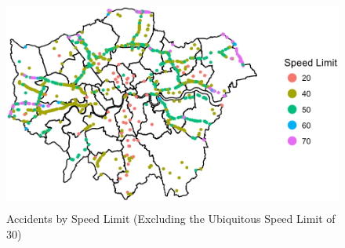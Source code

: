 \documentclass{neu_handout}
\begin{document}
\begin{figure}[!htb]
    \begin{center}
      \includegraphics[height=7cm,keepaspectratio]{sl_london.png}
      \caption{Accidents by Speed Limit (Excluding the Ubiquitous Speed Limit of 30)}
    \end{center}
\end{figure}
\end{document}
